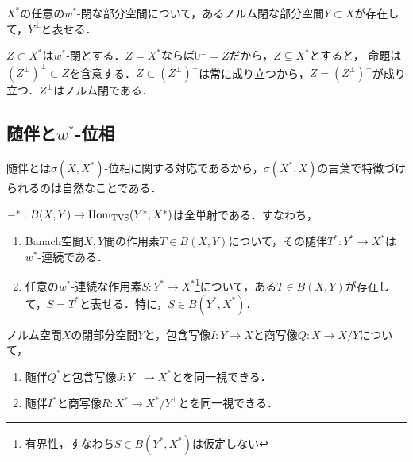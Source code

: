 \documentclass[uplatex,dvipdfmx]{jsreport}
\begin{document}
\begin{corollary}[$w^*$-閉な部分空間の表現]\label{cor-weak-star-closed-subspace}
    $X^*$の任意の$w^*$-閉な部分空間について，あるノルム閉な部分空間$Y\subset X$が存在して，$Y^\perp$と表せる．
\end{corollary}
\begin{Proof}
    $Z\subset X^*$は$w^*$-閉とする．$Z=X^*$ならば$0^\perp=Z$だから，$Z\subsetneq X^*$とすると，
    命題は$(Z^\perp)^\perp\subset Z$を含意する．$Z\subset(Z^\perp)^\perp$は常に成り立つから，$Z=(Z^\perp)^\perp$が成り立つ．$Z^\perp$はノルム閉である．
\end{Proof}


\subsection{随伴と$w^*$-位相}

\begin{tcolorbox}[colframe=ForestGreen, colback=ForestGreen!10!white,breakable,colbacktitle=ForestGreen!40!white,coltitle=black,fonttitle=\bfseries\sffamily,
title=]
    随伴とは$\sigma(X,X^*)$-位相に関する対応であるから，$\sigma(X^*,X)$の言葉で特徴づけられるのは自然なことである．
\end{tcolorbox}

\begin{proposition}[随伴の特徴付け]
    ${-}^*:B(X,Y)\to\mathrm{Hom}_{\mathrm{TVS}}(Y^*,X^*)$は全単射である．すなわち，
    \begin{enumerate}
        \item Banach空間$X,Y$間の作用素$T\in B(X,Y)$について，その随伴$T^*:Y^*\to X^*$は$w^*$-連続である．
        \item 任意の$w^*$-連続な作用素$S:Y^*\to X^*$\footnote{有界性，すなわち$S\in B(Y^*,X^*)$は仮定しない}について，ある$T\in B(X,Y)$が存在して，$S=T^*$と表せる．特に，$S\in B(Y^*,X^*)$．
    \end{enumerate}
\end{proposition}

\begin{proposition}\label{prop-標準写像の随伴}
    ノルム空間$X$の閉部分空間$Y$と，包含写像$I:Y\to X$と商写像$Q:X\to X/Y$について，
    \begin{enumerate}
        \item 随伴$Q^*$と包含写像$J:Y^\perp\to X^*$とを同一視できる．
        \item 随伴$I^*$と商写像$R:X^*\to X^*/Y^\perp$とを同一視できる．
    \end{enumerate}
\end{proposition}
\end{document}

